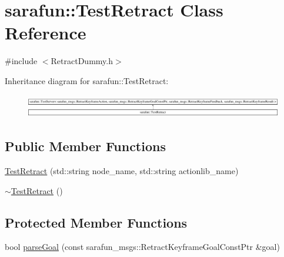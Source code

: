 \hypertarget{classsarafun_1_1TestRetract}{\section{sarafun\-:\-:Test\-Retract Class Reference}
\label{classsarafun_1_1TestRetract}
}


{\ttfamily \#include $<$Retract\-Dummy.\-h$>$}

Inheritance diagram for sarafun\-:\-:Test\-Retract\-:\begin{figure}[H]
\begin{center}
\leavevmode
\includegraphics[height=1.023766cm]{classsarafun_1_1TestRetract}
\end{center}
\end{figure}
\subsection*{Public Member Functions}
\begin{DoxyCompactItemize}
\item 
\hyperlink{classsarafun_1_1TestRetract_a82a06a6ab0232efbe0826ec719a05b60}{Test\-Retract} (std\-::string node\-\_\-name, std\-::string actionlib\-\_\-name)
\item 
\hyperlink{classsarafun_1_1TestRetract_a726afd78008fdc6c7b6226ea56306f30}{$\sim$\-Test\-Retract} ()
\end{DoxyCompactItemize}
\subsection*{Protected Member Functions}
\begin{DoxyCompactItemize}
\item 
bool \hyperlink{classsarafun_1_1TestRetract_a16161cb5e33ce3f5bc000cef4a32f23b}{parse\-Goal} (const sarafun\-\_\-msgs\-::\-Retract\-Keyframe\-Goal\-Const\-Ptr \&goal)
\end{DoxyCompactItemize}



